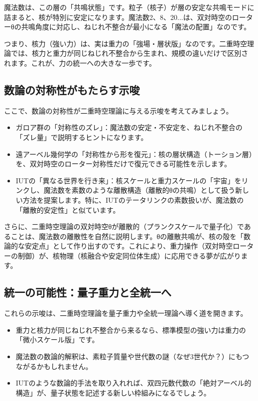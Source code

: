 \documentclass[dvipdfmx,12pt,a4paper]{jsarticle}
\begin{document}
魔法数は、この層の「共鳴状態」です。粒子（核子）が層の安定な共鳴モードに詰まると、核が特別に安定になります。魔法数2、8、20...は、双対時空のローターθの共鳴角度に対応し、ねじれ不整合が最小になる「魔法の配置」なのです。

つまり、核力（強い力）は、実は重力の「強場・層状版」なのです。二重時空理論では、核力と重力が同じねじれ不整合から生まれ、規模の違いだけで区別されます。これが、力の統一への大きな一歩です。

\subsection{数論の対称性がもたらす示唆}

ここで、数論の対称性が二重時空理論に与える示唆を考えてみましょう。
\begin{itemize}
  \item ガロア群の「対称性のズレ」：魔法数の安定・不安定を、ねじれ不整合の「ズレ量」で説明するヒントになります。
  \item 遠アーベル幾何学の「対称性から形を復元」：核の層状構造（トーション層）を、双対時空のローター対称性だけで復元できる可能性を示します。
  \item IUTの「異なる世界を行き来」：核スケールと重力スケールの「宇宙」をリンクし、魔法数を素数のような離散構造（離散的θの共鳴）として扱う新しい方法を提案します。特に、IUTのテータリンクの素数扱いが、魔法数の「離散的安定性」と似ています。
\end{itemize}

さらに、二重時空理論の双対時空θが離散的（プランクスケールで量子化）であることは、魔法数の離散性を自然に説明します。θの離散共鳴が、核の殻を「数論的な安定点」として作り出すのです。これにより、重力操作（双対時空ローターの制御）が、核物理（核融合や安定同位体生成）に応用できる夢が広がります。

\subsection{統一の可能性：量子重力と全統一へ}

これらの示唆は、二重時空理論を量子重力や全統一理論へ導く道を開きます。
\begin{itemize}
  \item 重力と核力が同じねじれ不整合から来るなら、標準模型の強い力は重力の「微小スケール版」です。
  \item 魔法数の数論的解釈は、素粒子質量や世代数の謎（なぜ3世代か？）にもつながるかもしれません。
  \item IUTのような数論的手法を取り入れれば、双四元数代数の「絶対アーベル的構造」が、量子状態を記述する新しい枠組みになるでしょう。
\end{itemize}
\end{document}

